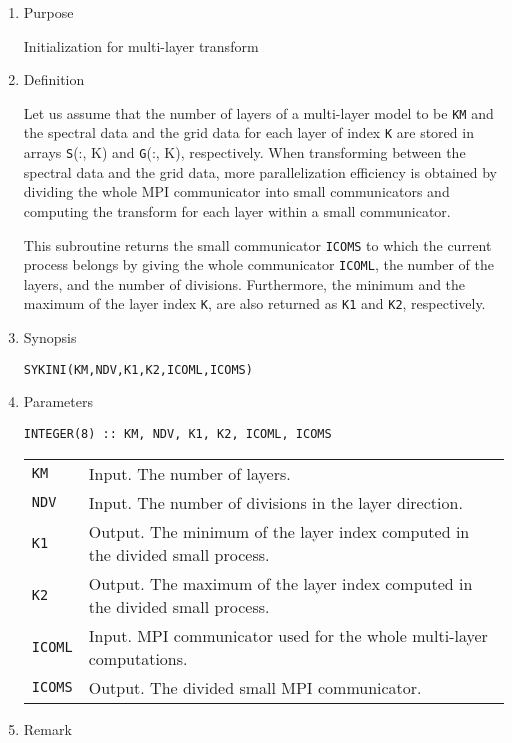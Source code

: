 \documentclass[a4paper]{scrartcl}
\begin{document}
\begin{enumerate}

\item Purpose

Initialization for multi-layer transform

\item Definition

Let us assume that the number of layers of a multi-layer model
to be \texttt{KM} and
the spectral data and the grid data for each layer of index
\texttt{K} are stored
in arrays {\texttt S(:, K)} and {\texttt G(:, K)}, respectively.
When transforming between the spectral data and the grid data,
more parallelization efficiency is obtained by dividing
the whole MPI communicator into small communicators and
computing the transform for each layer within a small
communicator.

This subroutine returns the small communicator \texttt{ICOMS}
to which the current process belongs by giving the whole
communicator \texttt{ICOML}, the number of the layers,
and the number of divisions.
Furthermore, the minimum and the maximum of the layer index
\texttt{K}, are also returned as
\texttt{K1} and \texttt{K2}, respectively.
  
\item Synopsis 
    
\texttt{SYKINI(KM,NDV,K1,K2,ICOML,ICOMS)}
  
\item Parameters

\begin{verbatim}  
INTEGER(8) :: KM, NDV, K1, K2, ICOML, ICOMS
\end{verbatim}  
    
\begin{tabular}{ll}
\texttt{KM} & Input. The number of layers.\\
\texttt{NDV} & Input. The number of divisions in the layer direction.\\
\texttt{K1} & Output. The minimum of the layer index computed in the
divided small process.\\
\texttt{K2} & Output. The maximum of the layer index computed in the
divided small process.\\
\texttt{ICOML} & Input. MPI communicator used for the whole
multi-layer computations.\\
\texttt{ICOMS} & Output. The divided small MPI communicator.
\end{tabular}

\item Remark


\end{enumerate}
\end{document}
